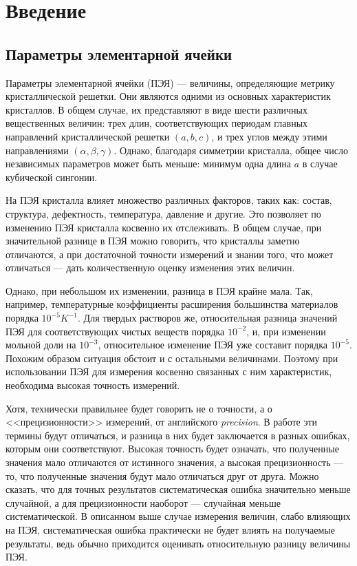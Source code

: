 \section{Введение}

\subsection{Параметры элементарной ячейки}

Параметры элементарной ячейки (ПЭЯ) --- величины, определяющие метрику кристаллической решетки.
Они являются одними из основных характеристик кристаллов.
В общем случае, их представляют в виде шести различных вещественных величин: трех длин, соответствующих периодам главных направлений кристаллической решетки $(a, b, c)$, и трех углов между этими направлениями $(\alpha, \beta, \gamma)$.
Однако, благодаря симметрии кристалла, общее число независимых параметров может быть меньше: минимум одна длина $a$ в случае кубической сингонии.

На ПЭЯ кристалла влияет множество различных факторов, таких как: состав, структура, дефектность, температура, давление и другие.
Это позволяет по изменению ПЭЯ кристалла косвенно их отслеживать.
В общем случае, при значительной разнице в ПЭЯ можно говорить, что кристаллы заметно отличаются, а при достаточной точности измерений и знании того, что может отличаться --- дать количественную оценку изменения этих величин.

Однако, при небольшом их изменении, разница в ПЭЯ крайне мала.
Так, например, температурные коэффициенты расширения большинства материалов порядка $10^{-5} \unit{K}^{-1}$.
Для твердых растворов же, относительная разница значений ПЭЯ для соответствующих чистых веществ порядка $10^{-2}$, и, при изменении мольной доли на $10^{-3}$, относительное изменение ПЭЯ уже составит порядка $10^{-5}$.
Похожим образом ситуация обстоит и с остальными величинами.
Поэтому при использовании ПЭЯ для измерения косвенно связанных с ним характеристик, необходима высокая точность измерений.

Хотя, технически правильнее будет говорить не о точности, а о <<прецизионности>> измерений, от английского \textit{precision}.
В работе эти термины будут отличаться, и разница в них будет заключается в разных ошибках, которым они соответствуют.
Высокая точность будет означать, что полученные значения мало отличаются от истинного значения, а высокая прецизионность --- то, что полученные значения будут мало отличаться друг от друга.
Можно сказать, что для точных результатов систематическая ошибка значительно меньше случайной, а для прецизионности наоборот --- случайная меньше систематической.
В описанном выше случае измерения величин, слабо влияющих на ПЭЯ, систематическая ошибка практически не будет влиять на получаемые результаты, ведь обычно приходится оценивать относительную разницу величины ПЭЯ.

